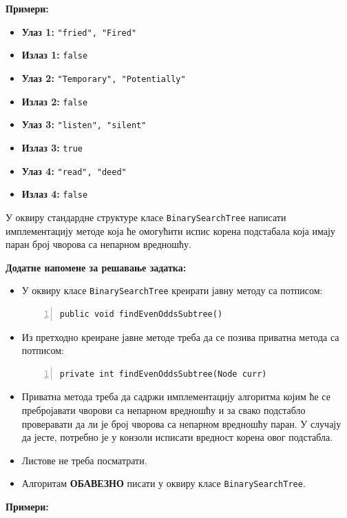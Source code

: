 \textbf{Примери:}
\begin{itemize}
	\item \textbf{Улаз 1:} \texttt{"fried", "Fired"}
	\item \textbf{Излаз 1:} \texttt{false}
	\item \textbf{Улаз 2:} \texttt{"Temporary", "Potentially"}
	\item \textbf{Излаз 2:} \texttt{false}
	\item \textbf{Улаз 3:} \texttt{"listen", "silent"}
	\item \textbf{Излаз 3:} \texttt{true}
	\item \textbf{Улаз 4:} \texttt{"read", "deed"}
	\item \textbf{Излаз 4:} \texttt{false}
\end{itemize}



У оквиру стандардне структуре класе \texttt{BinarySearchTree} написати имплементацију методе која ће омогућити испис корена подстабала која имају паран број чворова са непарном вредношћу.

\textbf{Додатне напомене за решавање задатка:}
\begin{itemize}
	\item У оквиру класе \texttt{BinarySearchTree} креирати јавну методу са потписом:
	\begin{Verbatim}[fontsize=\footnotesize, numbers=left, xleftmargin=10mm]
public void findEvenOddsSubtree()
	\end{Verbatim}
	\item Из претходно креиране јавне методе треба да се позива приватна метода са потписом:
	\begin{Verbatim}[fontsize=\footnotesize, numbers=left, xleftmargin=10mm]
private int findEvenOddsSubtree(Node curr)
	\end{Verbatim}
	\item Приватна метода треба да садржи имплементацију алгоритма којим ће се пребројавати чворови са непарном вредношћу и за свако подстабло проверавати да ли је број чворова са непарном вредношћу паран. У случају да јесте, потребно је у конзоли исписати вредност корена овог подстабла.
	\item Листове не треба посматрати.
	\item Алгоритам \textbf{ОБАВЕЗНО} писати у оквиру класе \texttt{BinarySearchTree}.
\end{itemize}

\textbf{Примери:}

